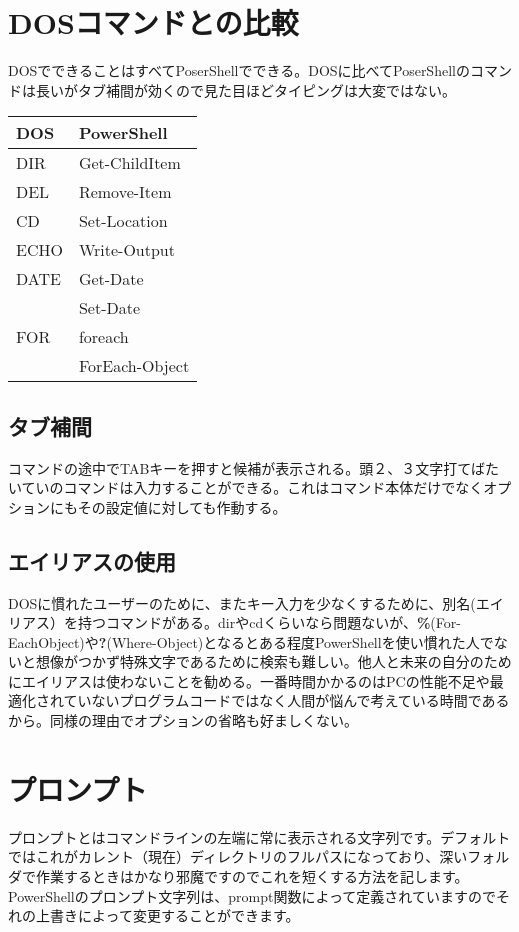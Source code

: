\documentclass[dvipdfmx]{jsarticle}
\begin{document}
\section{DOSコマンドとの比較}
DOSでできることはすべてPoserShellでできる。DOSに比べてPoserShellのコマンドは長いがタブ補間が効くので見た目ほどタイピングは大変ではない。

\hspace{3mm}

\begin{tabular}{ll}
DOS & PowerShell \\
\hline
DIR & Get-ChildItem \\
DEL & Remove-Item \\
CD & Set-Location \\
ECHO & Write-Output \\
DATE & Get-Date \\
& Set-Date \\
FOR & foreach \\
& ForEach-Object
\end{tabular}

\subsection{タブ補間}
コマンドの途中でTABキーを押すと候補が表示される。頭２、３文字打てばたいていのコマンドは入力することができる。これはコマンド本体だけでなくオプションにもその設定値に対しても作動する。

\subsection{エイリアスの使用}
DOSに慣れたユーザーのために、またキー入力を少なくするために、別名(エイリアス）を持つコマンドがある。dirやcdくらいなら問題ないが、\textbf{\%}(For-EachObject)や\textbf{?}(Where-Object)となるとある程度PowerShellを使い慣れた人でないと想像がつかず特殊文字であるために検索も難しい。他人と未来の自分のためにエイリアスは使わないことを勧める。一番時間かかるのはPCの性能不足や最適化されていないプログラムコードではなく人間が悩んで考えている時間であるから。同様の理由でオプションの省略も好ましくない。


\section{プロンプト}
プロンプトとはコマンドラインの左端に常に表示される文字列です。デフォルトではこれがカレント（現在）ディレクトリのフルパスになっており、深いフォルダで作業するときはかなり邪魔ですのでこれを短くする方法を記します。
PowerShellのプロンプト文字列は、prompt関数によって定義されていますのでそれの上書きによって変更することができます。
\end{document}
